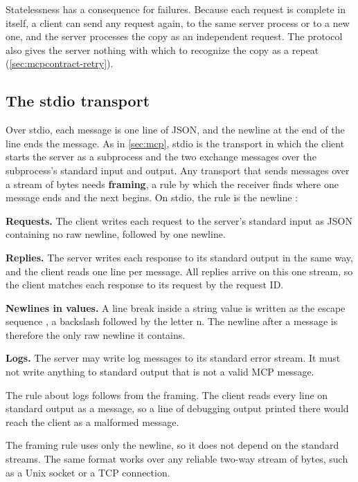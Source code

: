 Statelessness has a consequence for failures. Because each request is complete in itself, a client
can send any request again, to the same server process or to a new one, and the server processes
the copy as an independent request. The protocol also gives the server nothing with which to
recognize the copy as a repeat (\cref{sec:mcpcontract-retry}).

\subsection{The stdio transport}
\label{sec:mcpcontract-stdio}

Over stdio, each message is one line of JSON, and the newline at the end of the line ends the
message. As in \cref{sec:mcp}, stdio is the transport in which the client starts the server as a
subprocess and the two exchange messages over the subprocess's standard input and output. Any
transport that sends messages over a stream of bytes needs \textbf{framing}, a rule by which the
receiver finds where one message ends and the next begins. On stdio, the rule is the newline
\citep{mcp-spec-2026}:
\bi
\item \textbf{Requests.} The client writes each request to the server's standard input as JSON
containing no raw newline, followed by one newline.
\item \textbf{Replies.} The server writes each response to its standard output in the same way, and
the client reads one line per message. All replies arrive on this one stream, so the client matches
each response to its request by the request ID.
\item \textbf{Newlines in values.} A line break inside a string value is written as the escape
sequence , a backslash followed by the letter n. The newline after a
message is therefore the only raw newline it contains.
\item \textbf{Logs.} The server may write log messages to its standard error stream. It must not
write anything to standard output that is not a valid MCP message.
\ei

The rule about logs follows from the framing. The client reads every line on standard output as a
message, so a line of debugging output printed there would reach the client as a malformed message.

The framing rule uses only the newline, so it does not depend on the standard streams. The same
format works over any reliable two-way stream of bytes, such as a Unix socket or a TCP connection.

